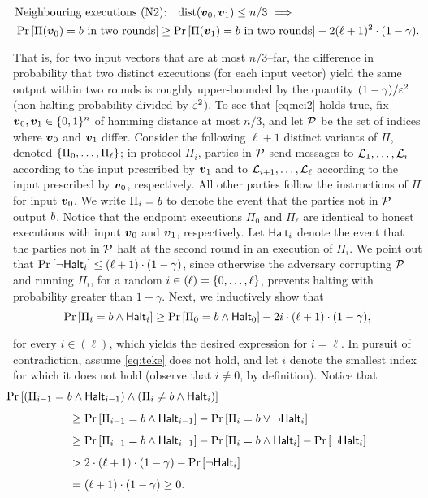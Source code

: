 \ifdefined\IsFullVersion\else
\vspace{-.1cm}
\fi
\begin{align} \label{eq:nei2}
&\text{Neighbouring executions (N2):} \quad \mathrm{dist}({ \boldsymbol{v}}_0,{ \boldsymbol{v}}_1)\le n/3 \implies \\
 & \Pr_{}\left[\Pi({ \boldsymbol{v}}_0)=b\text{ in two rounds}\right] \ge \Pr_{}\left[ \Pi({ \boldsymbol{v}}_1)=b\text{ in two rounds}\right] - 2  (\ell +1  )^2  \cdot (1-\gamma). \nonumber
\end{align}
That is, for two input vectors that are at most $n/3$--far, the difference in probability that two distinct executions (for each input vector) yield the same output within two rounds is roughly upper-bounded by the quantity $(1-\gamma)/\varepsilon^2$ (\ie non-halting probability divided by $\varepsilon^2$). To see that \cref{eq:nei2} holds true, fix ${ \boldsymbol{v}}_0,{ \boldsymbol{v}}_1\in {\{0,1\}^n}$ of hamming distance at most $n/3$, and let $\mathcal{P}$ be the set of indices where ${ \boldsymbol{v}}_0$ and ${ \boldsymbol{v}}_1$ differ. Consider the following $\ell+1$ distinct variants of $\Pi$, denoted $\left\{\Pi_0,\ldots, \Pi_\ell\right\}$; in protocol $\Pi_i$, parties in $\mathcal{P}$ send messages to ${\cal{L}}_1,\ldots, {\cal{L}}_i$ according to the input prescribed by ${ \boldsymbol{v}}_1$ and to ${\cal{L}}_{i+1},\ldots, {\cal{L}}_\ell$ according to the input prescribed by ${ \boldsymbol{v}}_0$, respectively. All other parties follow the instructions of $\Pi$ for input ${ \boldsymbol{v}}_0$. We write $\Pi_i=b$ to denote the event that the parties not in $\mathcal{P}$ output $b$. Notice that the endpoint executions $\Pi_0$ and $\Pi_{\ell}$ are identical to honest executions with input ${ \boldsymbol{v}}_0$ and ${ \boldsymbol{v}}_1$, respectively. Let $\mathsf{Halt}_i$ denote the event that the parties not in $\mathcal{P}$ halt at the second round in an execution of $\Pi_{i}$. We point out that $\Pr_{}\left[ \neg \mathsf{Halt}_i\right]\le (\ell+1)\cdot (1-\gamma) $, since otherwise the adversary corrupting $\mathcal{P}$ and running $\Pi_i$, for a random $i\in (\ell) = \left\{0,\ldots,\ell\right\}$, prevents halting with probability greater than $1-\gamma$. Next, we inductively show that
\ifdefined\IsFullVersion\else
\vspace{-.2cm}
\fi
\begin{align}
\Pr_{}\left[\Pi_i=b \land \mathsf{Halt}_i\right] \ge \Pr_{}\left[  \Pi_{0} =b \land \mathsf{Halt}_0\right] - 2i\cdot (\ell+1) \cdot (1-\gamma),\label{eq:teke}
\end{align}
 for every $i\in (\ell)$, which yields the desired expression for $i=\ell$. In pursuit of contradiction, assume \cref{eq:teke} does not hold, and let $i$ denote the smallest index for which it does not hold (observe that $i\ne 0$, by definition). Notice that
\ifdefined\IsFullVersion\else
\vspace{-.1cm}
\fi
\begin{align*}
& \hspace*{-2cm}\pr{(\Pi_{i-1}= \o  \land \halt_{i-1}) \land  (\Pi_{i }\neq \o\land  \halt_i)}\\
&\ge  \pr{\Pi_{i-1}=\o \land \halt_{i-1}}-\pr{ \Pi_{i }= \o\vee  \neg \halt_i}\\
&\ge  \pr{\Pi_{i-1}=\o \land \halt_{i-1}}-\pr{ \Pi_{i }= \o\land   \halt_i} - \pr{ \neg \halt_i}\\
&>    2\cdot (\ell+1) \cdot (1-\gamma) - \pr{ \neg \halt_i} \\
&= (\ell+1) \cdot (1-\gamma) \ge 0.
\end{align*}
